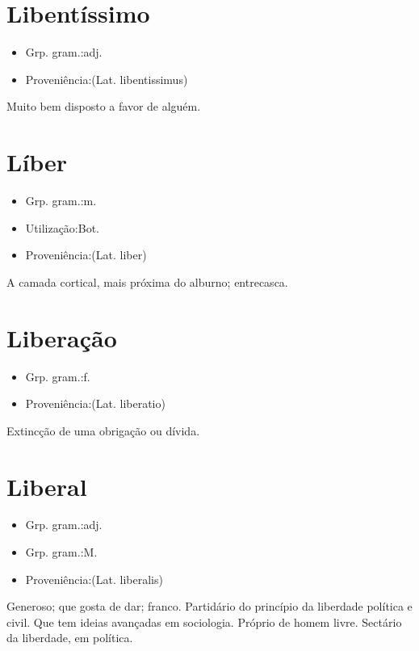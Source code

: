 \section{Libentíssimo}
\begin{itemize}
\item {Grp. gram.:adj.}
\end{itemize}
\begin{itemize}
\item {Proveniência:(Lat. \textunderscore libentissimus\textunderscore )}
\end{itemize}
Muito bem disposto a favor de alguém.
\section{Líber}
\begin{itemize}
\item {Grp. gram.:m.}
\end{itemize}
\begin{itemize}
\item {Utilização:Bot.}
\end{itemize}
\begin{itemize}
\item {Proveniência:(Lat. \textunderscore liber\textunderscore )}
\end{itemize}
A camada cortical, mais próxima do alburno; entrecasca.
\section{Liberação}
\begin{itemize}
\item {Grp. gram.:f.}
\end{itemize}
\begin{itemize}
\item {Proveniência:(Lat. \textunderscore liberatio\textunderscore )}
\end{itemize}
Extincção de uma obrigação ou dívida.
\section{Liberal}
\begin{itemize}
\item {Grp. gram.:adj.}
\end{itemize}
\begin{itemize}
\item {Grp. gram.:M.}
\end{itemize}
\begin{itemize}
\item {Proveniência:(Lat. \textunderscore liberalis\textunderscore )}
\end{itemize}
Generoso; que gosta de dar; franco.
Partidário do princípio da liberdade política e civil.
Que tem ideias avançadas em sociologia.
Próprio de homem livre.
Sectário da liberdade, em política.
